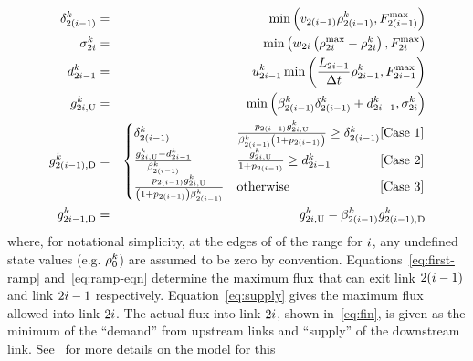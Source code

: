 \begin{eqnarray}
\demand_{2\left(\link-1\right)}^{\tind} & = & \min\left(\ffspeed_{2\left(i-1\right)}\densitydiscrete{2\left(\link-1\right)}{\tind},F_{2\left(\link-1\right)}^{\max}\right)\label{eq:first-ramp}\\
\supply_{2\link}^{\tind} & = & \min\left(\congspeed_{2i}\left(\density_{2i}^{\max}-\densitydiscrete{2\link}{\tind}\right),F_{2i}^{\max}\right)\label{eq:supply}\\
\rampDemand_{2\link-1}^{\tind} & = & \ramp_{2\link-1}^{\tind}\min\left(\frac{\length_{2\link-1}}{\Delta t}\densitydiscrete{2\link-1}{\tind},F_{2i-1}^{\max}\right)\label{eq:ramp-eqn}\\
\fin{2\link}{\tind} & = & \min\left(\splitratio_{2\left(\link-1\right)}^{\tind}\demand_{2\left(\link-1\right)}^{\tind}+\rampDemand_{2\link-1}^{\tind},\supply_{2\link}^{\tind}\right)\label{eq:fin}\\
\fout{2\left(\link-1\right)}{\tind} & = & \begin{cases}
\demand_{2\left(\link-1\right)}^{\tind} & \frac{p_{2(\link-1)}\fin{2\link}{\tind}}{\splitratio_{2\left(\link-1\right)}^{\tind}\left(1+p_{2(\link-1)}\right)}\ge\demand_{2\left(\link-1\right)}^{\tind}\hfill\text{[Case 1]}\\
\frac{\fin{2\link}{\tind}-\rampDemand_{2\link-1}^{\tind}}{\splitratio_{2\left(\link-1\right)}^{\tind}} & \frac{\fin{2\link}{\tind}}{1+p_{2(\link-1)}}\ge\rampDemand_{2\link-1}^{\tind}\hfill\text{[Case 2}]\\
\frac{p_{2(\link-1)}\fin{2\link}{\tind}}{\left(1+p_{2(\link-1)}\right)\splitratio_{2\left(\link-1\right)}^{\tind}} & \text{otherwise}\hfill[\text{Case 3]}
\end{cases}\label{eq:merge}\\
\fout{2\link-1}{\tind} & = & \fin{2\link}{\tind}-\splitratio_{2\left(\link-1\right)}^{\tind}\fout{2\left(\link-1\right)}{\tind}\label{eq:last-ramp}
\end{eqnarray}
where, for notational simplicity, at the edges of of the range for
$i$, any undefined state values (e.g. $\rho_{0}^{k}$)
are assumed to be zero by convention. Equations~\eqref{eq:first-ramp}
and~\eqref{eq:ramp-eqn} determine the maximum flux that can exit
link $2(i-1)$ and link $2i-1$ respectively. Equation~\eqref{eq:supply}
gives the maximum flux allowed into link $2i$. The actual flux
into link $2i$, shown in~\eqref{eq:fin}, is given as the minimum
of the ``demand'' from upstream links and ``supply'' of the downstream
link. See~\cite{Monache2014PdeOde} for more details on the model for this
